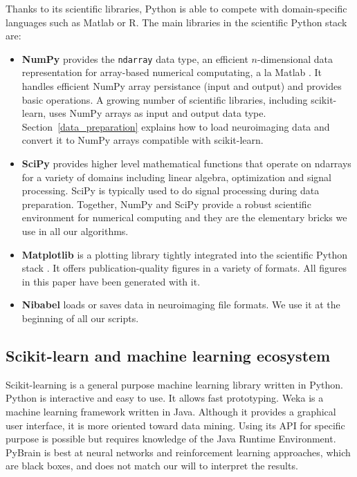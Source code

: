 \documentclass{frontiersSCNS} %
\begin{document}
Thanks to its scientific libraries, Python is able to compete with domain-specific
languages such as Matlab or R. The main libraries in the scientific Python stack are:
\begin{itemize}
    \item{\bf NumPy} provides the \verb!ndarray! data type, an efficient $n$-dimensional data
        representation for array-based numerical computating, a la Matlab
        \citep{vanderwalt2011}. It handles efficient NumPy array persistance
        (input and output) and provides basic operations. A
        growing number of scientific libraries, including scikit-learn, uses NumPy arrays
        as input and output data type. Section~\ref{data_preparation} explains
        how to load neuroimaging data and convert it to NumPy arrays compatible
        with scikit-learn.

    \item{\bf SciPy} provides higher level mathematical functions that operate on ndarrays for
        a variety of domains including linear algebra, optimization and signal
        processing. SciPy is typically used to do signal processing during data
        preparation.
        Together, NumPy and SciPy provide a robust scientific environment
        for numerical computing and they are the elementary bricks we use in all our
        algorithms.

    \item{\bf Matplotlib} is a plotting library tightly integrated into the
        scientific Python stack \citep{hunter2007}. It offers publication-quality figures in
        a variety of formats.
        All figures in this paper have been generated with it.

    \item{\bf Nibabel} loads or saves data in neuroimaging file formats.
	We use it at the beginning of all our scripts.
\end{itemize}

\subsection{Scikit-learn and machine learning ecosystem}

Scikit-learning is a general purpose machine learning library written in Python.
Python is interactive and easy to use. It allows fast prototyping. Weka
\citep{hall2009weka} is a machine learning framework written in Java. Although
it provides a graphical user interface, it is more oriented toward data mining.
Using its API for specific purpose is possible but requires knowledge of the
Java Runtime Environment. PyBrain \citep{schaul2010pybrain} is best at neural networks
and reinforcement learning approaches, which are black boxes, and does not match
our will to interpret the results.
\end{document}
